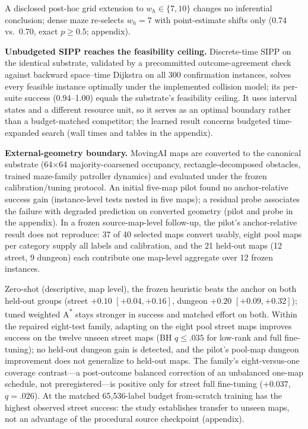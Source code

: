 \documentclass[letterpaper]{article} %
\begin{document}
A disclosed post-hoc grid extension to $w_h \in \{7, 10\}$ changes no inferential conclusion; dense maze re-selects $w_h{=}7$ with point-estimate shifts only (0.74 vs.\ 0.70, exact $p \geq 0.5$; appendix).

\textbf{Unbudgeted SIPP reaches the feasibility ceiling.} Discrete-time SIPP \citep{phillips2011sipp} on the identical substrate, validated by a precommitted outcome-agreement check against backward space--time Dijkstra on all 300 confirmation instances, solves every feasible instance optimally under the implemented collision model; its per-suite success (0.94--1.00) equals the substrate's feasibility ceiling. It uses interval states and a different resource unit, so it serves as an optimal boundary rather than a budget-matched competitor; the learned result concerns budgeted time-expanded search (wall times and tables in the appendix).

\textbf{External-geometry boundary.} MovingAI maps \citep{sturtevant2012movingai} are converted to the canonical substrate (64$\times$64 majority-coarsened occupancy, rectangle-decomposed obstacles, trained maze-family patroller dynamics) and evaluated under the frozen calibration/tuning protocol. An initial five-map pilot found no anchor-relative success gain (instance-level tests nested in five maps); a residual probe associates the failure with degraded prediction on converted geometry (pilot and probe in the appendix). In a frozen source-map-level follow-up, the pilot's anchor-relative result does not reproduce: 37 of 40 selected maps convert usably, eight pool maps per category supply all labels and calibration, and the 21 held-out maps (12 street, 9 dungeon) each contribute one map-level aggregate over 12 frozen instances.

Zero-shot (descriptive, map level), the frozen heuristic beats the anchor on both held-out groups (street $+0.10$ $[+0.04,+0.16]$, dungeon $+0.20$ $[+0.09,+0.32]$); tuned weighted A\textsuperscript{*} stays stronger in success and matched effort on both. Within the repaired eight-test family, adapting on the eight pool street maps improves success on the twelve unseen street maps (BH $q \leq .035$ for low-rank and full fine-tuning); no held-out dungeon gain is detected, and the pilot's pool-map dungeon improvement does not generalize to held-out maps. The family's eight-versus-one coverage contrast---a post-outcome balanced correction of an unbalanced one-map schedule, not preregistered---is positive only for street full fine-tuning ($+0.037$, $q{=}.026$). At the matched 65{,}536-label budget from-scratch training has the highest observed street success: the study establishes transfer to unseen maps, not an advantage of the procedural source checkpoint (appendix).
\end{document}
